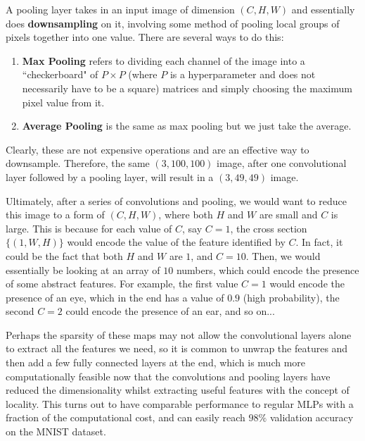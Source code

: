 \documentclass{article}
\begin{document}
    \begin{definition}
      A pooling layer takes in an input image of dimension $(C, H, W)$ and essentially does \textbf{downsampling} on it, involving some method of pooling local groups of pixels together into one value. There are several ways to do this: 
      \begin{enumerate}
        \item \textbf{Max Pooling} refers to dividing each channel of the image into a ``checkerboard" of $P \times P$ (where $P$ is a hyperparameter and does not necessarily have to be a square) matrices and simply choosing the maximum pixel value from it. 
        \item \textbf{Average Pooling} is the same as max pooling but we just take the average. 
      \end{enumerate}
      Clearly, these are not expensive operations and are an effective way to downsample. Therefore, the same $(3, 100, 100)$ image, after one convolutional layer followed by a pooling layer, will result in a $(3, 49, 49)$ image.  
    \end{definition}

    Ultimately, after a series of convolutions and pooling, we would want to reduce this image to a form of $(C, H, W)$, where both $H$ and $W$ are small and $C$ is large. This is because for each value of $C$, say $C = 1$, the cross section $\{(1, W, H)\}$ would encode the value of the feature identified by $C$. In fact, it could be the fact that both $H$ and $W$ are $1$, and $C = 10$. Then, we would essentially be looking at an array of $10$ numbers, which could encode the presence of some abstract features. For example, the first value $C = 1$ would encode the presence of an eye, which in the end has a value of $0.9$ (high probability), the second $C = 2$ could encode the presence of an ear, and so on... 

    Perhaps the sparsity of these maps may not allow the convolutional layers alone to extract all the features we need, so it is common to unwrap the features and then add a few fully connected layers at the end, which is much more computationally feasible now that the convolutions and pooling layers have reduced the dimensionality whilst extracting useful features with the concept of locality. This turns out to have comparable performance to regular MLPs with a fraction of the computational cost, and can easily reach $98\%$ validation accuracy on the MNIST dataset. 
\end{document}
